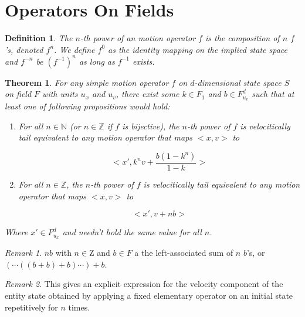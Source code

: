 \documentclass{book}
\newtheorem{definition}{Definition}
\newtheorem{theorem}{Theorem}
\theoremstyle{definition}\newtheorem{mechanism}{Mechanism}
\theoremstyle{remark}\newtheorem*{remark}{Remark}
\begin{document}

\section{Operators On Fields}

\begin{definition}
	The $n$-th power of an motion operator $f$ is the composition of $n$ $f$'s, denoted $f^n$. We define $f^0$ as the identity mapping on the implied state space and $f^{-n}$ be $(f^{-1})^n$ as long as $f^{-1}$ exists.
\end{definition}

\begin{theorem}\label{thm:vel-formula-gen}
	For any simple motion operator $f$ on $d$-dimensional state space $S$ on field $F$ with units $u_x$ and $u_v$, there exist some $k \in F_1$ and $b\in F_{u_v}^d$ such that at least one of following propositions would hold:
	
	\begin{enumerate}
		\item For all $n\in \mathbb N$ (or $n\in \mathbb Z$ if $f$ is bijective), the $n$-th power of $f$ is velocitically tail equivalent to any motion operator that maps $<x, v>$ to 
		
		\begin{equation*}
			<x', k^nv + \frac{b(1 - k^n)}{1-k}>
		\end{equation*}
		
		\item For all $n\in \mathbb Z$, the $n$-th power of $f$ is velocitically tail equivalent to any motion operator that maps $<x, v>$ to 
		
		\begin{equation*}
			<x', v + nb>
		\end{equation*}
	\end{enumerate}
	
	Where $x' \in F_{u_x}^d$ and needn't hold the same value for all $n$.
\end{theorem}

\begin{remark}
	$nb$ with $n\in \mathrm Z$ and $b\in F$ a the left-associated sum of $n$ $b$'s, or $(\cdots((b + b) + b)\cdots) + b$.
\end{remark}

\begin{remark}
	This gives an explicit expression for the velocity component of the entity state obtained by applying a fixed elementary operator on an initial state repetitively for $n$ times.
\end{remark}
\end{document}
